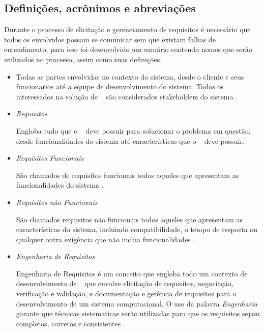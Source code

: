 \subsection{Definições, acrônimos e abreviações}

Durante o processo de elicitação e gerenciamento de requisitos é necessário que todos os envolvidos possam se comunicar sem que existam falhas de entendimento, para isso foi desenvolvido um sumário contendo nomes que serão utilizados no processo, assim como suas definições.

\begin{itemize}

	\item \stakeholder

		Todas as partes envolvidas no contexto do sistema, desde o cliente e seus funcionarios até a equipe de desenvolvimento do sistema. Todos os interessados na solução de \sw~ são considerados stakeholders do sistema \cite{sommerville2003engenharia}.

	\item \textit{Requisitos} 

		Engloba tudo que o \sw~ deve possuir para solucionar o problema em questão, desde funcionalidades do sistema até características que o \sw~ deve possuir.

	\item \textit{Requisitos Funcionais}

		São chamados de requisitos funcionais todos aqueles que apresentam as funcionalidades do sistema \cite{sommerville2003engenharia}.

	\item \textit{Requisitos não Funcionais}

		São chamados requisitos não funcionais todos aqueles que apresentam as características do sistema, incluindo compatibilidade, o tempo de resposta ou qualquer outra exigência que não inclua funcionalidades \cite{sommerville2003engenharia}.

	\item \textit{Engenharia de Requisitos}

		Engenharia de Requisitos é um conceito que engloba todo um contexto de desenvolvimento de \sw~ que envolve elicitação de requisitos, negociação, verificação e validação, e documentação e gerência de requisitos para o desenvolvimento de um sistema computacional. O uso da palavra \textit{Engenharia} garante que técnicas sistematicas serão utilizadas para que os requisitos sejam completos, corretos e consistentes \cite{de2004analise}. 


\end{itemize}
